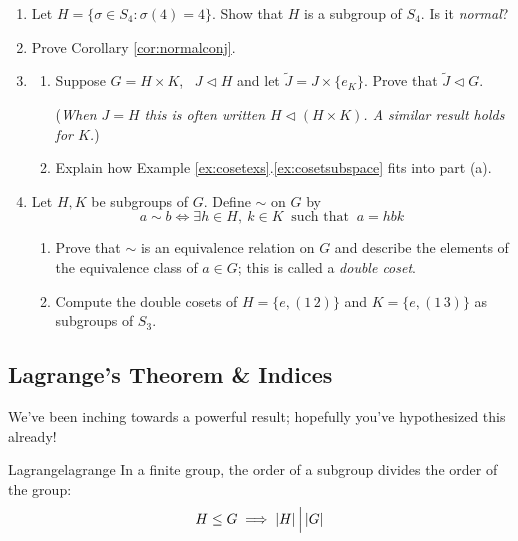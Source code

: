 \begin{exercises}{}{}
\begin{enumerate}
	
		\item Let $H=\{\sigma\in S_4:\sigma(4)=4\}$. Show that $H$ is a subgroup of $S_4$. Is it \emph{normal}?
		
		
		\item Prove Corollary \ref{cor:normalconj}.
	  
	  
	  \item\label{exs:directprodfactor}\begin{enumerate}
	    \item Suppose $G=H\times K$, \ $J\triangleleft H$ and let $\widetilde J=J\times\{e_K\}$. Prove that $\widetilde J\triangleleft G$.\par
	    (\emph{When $J=H$ this is often written $H\triangleleft (H\times K)$. A similar result holds for $K$.})
	    \item Explain how Example \ref*{ex:cosetexs}.\ref{ex:cosetsubspace} fits into part (a).
	  \end{enumerate} 
	  
		
		\item Let $H,K$ be subgroups of $G$. Define $\sim$ on $G$ by
		\[
			a\sim b\iff \exists h\in H,\ k\in K \ \text{ such that }\ a=hb k
		\]
		\begin{enumerate}
	  	\item Prove that $\sim$ is an equivalence relation on $G$ and describe the elements of the equivalence class of $a\in G$; this is called a \emph{double coset}.
	  	\item Compute the double cosets of $H=\{e,(1\,2)\}$ and $K=\{e,(1\,3)\}$ as subgroups of $S_3$. 
		\end{enumerate}

	\end{enumerate}
\end{exercises}


\clearpage


\subsection{Lagrange's Theorem \& Indices}\label{sec:lagrange}


We've been inching towards a powerful result; hopefully you've hypothesized this already!

\begin{thm}{Lagrange}{lagrange}
	In a finite group, the order of a subgroup divides the order of the group:\footnotemark
	\[
		H\le G\implies \left| H\right|\Big\vert \left| G\right|
	\]
\end{thm}

